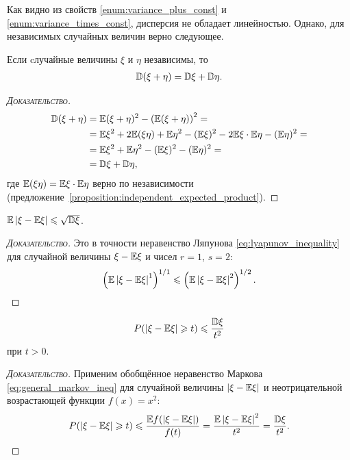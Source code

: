 \documentclass[../main.tex]{subfiles}
\begin{document}
Как видно из свойств \ref{enum:variance_plus_const} и \ref{enum:variance_times_const}, дисперсия не обладает линейностью. Однако, для независимых случайных величин верно следующее.

\begin{prop}
 Если cлучайные величины $ \xi  $ и $ \eta $ независимы, то
 \begin{align*}
  \mathbb D(\xi + \eta) = \mathbb D\xi + \mathbb D\eta.
 \end{align*}
\end{prop}
\begin{proof}[\normalfont\textsc{Доказательство}]
 \begin{align*}
  \mathbb D(\xi + \eta) &= \mathbb E(\xi + \eta)^{2} - \left( \mathbb E(\xi+\eta) \right)^{2} = \\
  &= \mathbb E\xi^{2} + 2\mathbb E(\xi\eta) + \mathbb E\eta^{2} -  (\mathbb E\xi)^{2} - 2\mathbb E\xi \cdot \mathbb E\eta - (\mathbb E\eta)^{2} = \\
  &=  \mathbb E\xi^{2} + \mathbb E\eta^{2} -  (\mathbb E\xi)^{2} - (\mathbb E\eta)^{2} = \\
  &=\mathbb D\xi+\mathbb D\eta,
 \end{align*} где $ \mathbb E(\xi\eta) = \mathbb E\xi \cdot \mathbb E\eta $ верно по независимости (предложение~\ref{proposition:independent_expected_product}).
\end{proof}

\begin{prop}
 $ \mathbb E \left| \xi - \mathbb E\xi \right| \leqslant \sqrt{\mathbb D\xi} $.
\end{prop}
\begin{proof}[\normalfont\textsc{Доказательство}]
 Это в точности неравенство Ляпунова \eqref{eq:lyapunov_inequality} для случайной величины $ \xi - \mathbb E\xi $ и чисел $ r=1 $, $ s=2 $:
 \begin{align*}
  \left(\mathbb E \left| \xi-\mathbb E\xi \right|^{1} \right)^{1 / 1} \leqslant \left( \mathbb E \left| \xi-\mathbb E\xi \right|^{2} \right)^{1 / 2}.
 \end{align*}
\end{proof}

\begin{prop}
 \label{proposition:chebyshev_inequality}
 \begin{align}
  \label{equation:chebyshev_inequality}
  P(\left| \xi - \mathbb E\xi \right| \geqslant t) \leqslant \frac{\mathbb D\xi}{t^{2}}
 \end{align} при $ t > 0 $.
\end{prop}
\begin{proof}[\normalfont\textsc{Доказательство}]
 Применим обобщённое неравенство Маркова \eqref{eq:general_markov_ineq} для случайной величины $ \left| \xi-\mathbb E\xi \right| $ и неотрицательной возрастающей функции $ f(x) = x^{2} $:
 \begin{align*}
  P(\left| \xi-\mathbb E\xi \right| \geqslant t) \leqslant \frac{\mathbb E f(\left| \xi-\mathbb E\xi \right|)}{f(t)} = \frac{\mathbb E \left| \xi-\mathbb E\xi \right|^{2}}{t^{2}} = \frac{\mathbb D\xi}{t^{2}}.
 \end{align*}
\end{proof}
\end{document}
